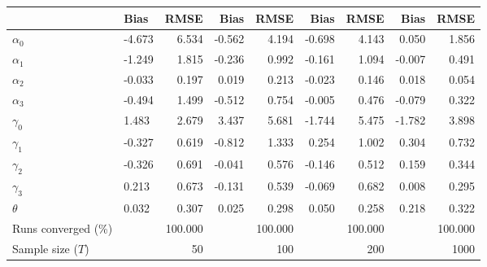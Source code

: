 
\begin{tabular}[t]{llrrrrrrr}
\toprule
  & Bias & RMSE & Bias & RMSE & Bias & RMSE & Bias & RMSE\\
\midrule
$\alpha_{0}$ & -4.673 & 6.534 & -0.562 & 4.194 & -0.698 & 4.143 & 0.050 & 1.856\\
$\alpha_{1}$ & -1.249 & 1.815 & -0.236 & 0.992 & -0.161 & 1.094 & -0.007 & 0.491\\
$\alpha_{2}$ & -0.033 & 0.197 & 0.019 & 0.213 & -0.023 & 0.146 & 0.018 & 0.054\\
$\alpha_{3}$ & -0.494 & 1.499 & -0.512 & 0.754 & -0.005 & 0.476 & -0.079 & 0.322\\
$\gamma_{0}$ & 1.483 & 2.679 & 3.437 & 5.681 & -1.744 & 5.475 & -1.782 & 3.898\\
$\gamma_{1}$ & -0.327 & 0.619 & -0.812 & 1.333 & 0.254 & 1.002 & 0.304 & 0.732\\
$\gamma_{2}$ & -0.326 & 0.691 & -0.041 & 0.576 & -0.146 & 0.512 & 0.159 & 0.344\\
$\gamma_{3}$ & 0.213 & 0.673 & -0.131 & 0.539 & -0.069 & 0.682 & 0.008 & 0.295\\
$\theta$ & 0.032 & 0.307 & 0.025 & 0.298 & 0.050 & 0.258 & 0.218 & 0.322\\
Runs converged (\%) &  & 100.000 &  & 100.000 &  & 100.000 &  & 100.000\\
Sample size ($T$) &  & 50 &  & 100 &  & 200 &  & 1000\\
\bottomrule
\end{tabular}
